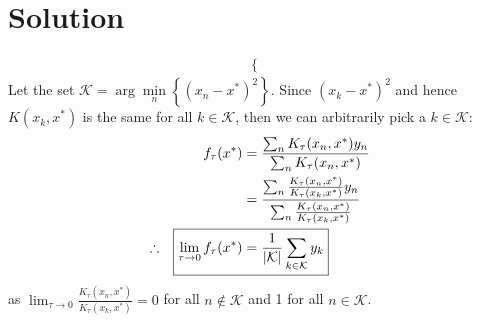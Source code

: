 \documentclass[submit]{../harvardml}
\newenvironment{solution}
  {\color{blue}\section*{Solution}}
{}
\begin{document}
\begin{solution}
\begin{enumerate}
\begin{enumerate}
\begin{align*}
\begin{cases}
                                \end{cases}
        \end{align*}
        Let the set $\mathcal{K} = \arg\min\limits_{n} \left\{ (x_n-x^*)^2 \right\}$. Since $(x_k-x^*)^2$ and hence $K(x_k,x^*)$ is the same for all $k \in \mathcal{K}$, then we can arbitrarily pick a $k \in \mathcal{K}$:
        \begin{align*}
            f_\tau(x^*) &= \frac{\sum_n K_\tau(x_n, x^*)y_n}{\sum_nK_\tau(x_n, x^*)} \\
            &= \frac{\sum_n \frac{K_\tau(x_n,x^*)}{K_\tau(x_k,x^*)}y_n}{\sum_n \frac{K_\tau(x_n,x^*)}{K_\tau(x_k,x^*)}} \\
            \therefore \quad \Aboxed{ \lim_{\tau \to 0} f_\tau(x^*) &= \frac{1}{|\mathcal{K}|}\sum_{k \in \mathcal{K}}y_k }
        \end{align*}
        as $\lim_{\tau \to 0} \frac{K_\tau(x_n,x^*)}{K_\tau(x_k,x^*)} = 0$ for all $n \notin \mathcal{K}$ and 1 for all $n \in \mathcal{K}$.
    \end{enumerate}
\end{enumerate}

\end{solution}
\end{document}

